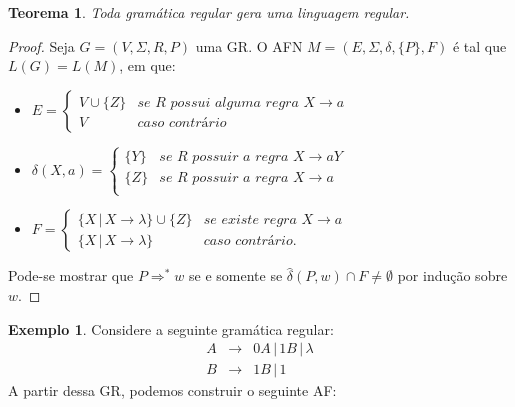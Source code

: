 \documentclass[a4paper]{article}
\newtheorem{Theorem}{Teorema}
\theoremstyle{definition}
\newtheorem{Example}{Exemplo}
\begin{document}
  \begin{Theorem}\label{teorema1}
    Toda gramática regular gera uma linguagem regular.
  \end{Theorem}
  \begin{proof}
    Seja $G = (V,\Sigma,R,P)$ uma GR. O AFN $M = (E, \Sigma, \delta, \{P\}, F)$
    é tal que $L(G) = L(M)$, em que:
    \begin{itemize}
      \item $E = \left\{ \begin{array}{ll}
                         V \cup \{Z\} & \textit{se R possui alguma regra }X \to
                                        a\\
                         V            & \textit{caso contrário}
                       \end{array}\right.$
      \item $\delta(X,a) = \left\{
          \begin{array}{ll}
            \{Y\} & \textit{se R possuir a regra }X \to aY\\
            \{Z\} & \textit{se R possuir a regra }X \to a\\
          \end{array}  
        \right.$
      \item $F = \left\{
          \begin{array}{ll}
            \{X\,|\,X \to \lambda\} \cup \{Z\} & \textit{se existe regra }X \to a\\
            \{X\,|\,X \to \lambda\} & \textit{caso contrário.}
          \end{array}
                \right.$
    \end{itemize}
    Pode-se mostrar que $P \Rightarrow^* w$ se e somente se
    $\widehat{\delta}(P,w)\cap F \neq \emptyset$ por indução sobre $w$.          
  \end{proof}

  \begin{Example}
    Considere a seguinte gramática regular:
    \[
      \begin{array}{lcl}
        A & \to & 0A \,|\, 1B \,|\, \lambda \\
        B & \to & 1B \,|\, 1
      \end{array}
    \]
    A partir dessa GR, podemos construir o seguinte AF:
    \begin{figure}[H]
      \centering
    \end{figure}
    
  \end{Example}
  
\end{document}
